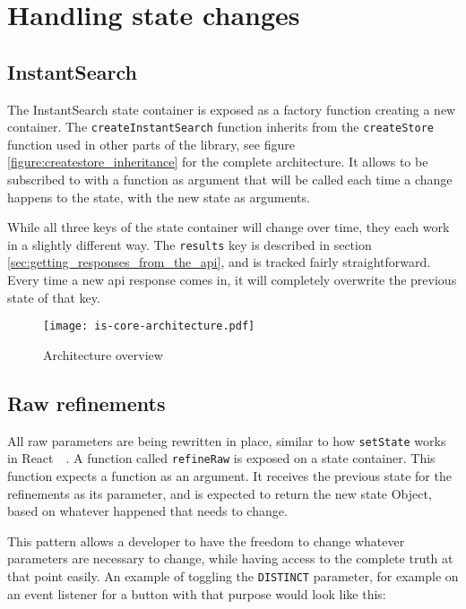 
\section{Handling state changes} %
\label{sec:handling_state_changes}

\subsection{InstantSearch}
\label{ssec:instantsearch}

The InstantSearch state container is exposed as a factory function creating a new container. The {\tt createInstantSearch} function inherits from the {\tt createStore} function used in other parts of the \gls{library}, see figure \ref{figure:createstore_inheritance} for the complete architecture. It allows to be subscribed to with a function as argument that will be called each time a change happens to the state, with the new state as arguments.

While all three keys of the state container will change over time, they each work in a slightly different way. The {\tt results} key is described in section \ref{sec:getting_responses_from_the_api}, and is tracked fairly straightforward. Every time a new \acrshort{api} response comes in, it will completely overwrite the previous state of that key.

\begin{figure}[H]
  \centering
  \texttt{[image: is-core-architecture.pdf]}
  \caption{Architecture overview}
  \label{figure:core-architecture}
\end{figure}

\subsection{Raw \glspl{refinement}}
\label{ssec:raw-refinments}

All raw parameters are being rewritten in place, similar to how {\tt setState} works in React~\cite{react-doc-state}~. A function called {\tt refineRaw} is exposed on a state container. This function expects a function as an argument. It receives the previous state for the \glspl{refinement} as its parameter, and is expected to return the new state Object, based on whatever happened that needs to change.

This pattern allows a developer to have the freedom to change whatever parameters are necessary to change, while having access to the complete truth at that point easily. An example of toggling the {\tt DISTINCT} parameter, for example on an event listener for a button with that purpose would look like this:


